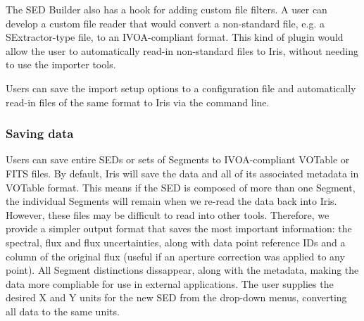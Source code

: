 The SED Builder also has a hook for adding custom file filters. A user can develop a custom file reader that would convert a non-standard file, e.g. a SExtractor-type file, to an IVOA-compliant format. This kind of plugin would allow the user to automatically read-in non-standard files to Iris, without needing to use the importer tools.

Users can save the import setup options to a configuration file and automatically read-in files of the same format to Iris via the command line.

\subsubsection{Saving data}
Users can save entire SEDs or sets of Segments to IVOA-compliant VOTable or FITS files. By default, Iris will save the data and all of its associated metadata in VOTable format. This means if the SED is composed of more than one Segment, the individual Segments will remain when we re-read the data back into Iris. However, these files may be difficult to read into other tools. Therefore, we provide a simpler output format that saves the most important information: the spectral, flux and flux uncertainties, along with data point reference IDs and a column of the original flux (useful if an aperture correction was applied to any point). All Segment distinctions dissappear, along with the metadata, making the data more compliable for use in external applications. The user supplies the desired X and Y units for the new SED from the drop-down menus, converting all data to the same units.